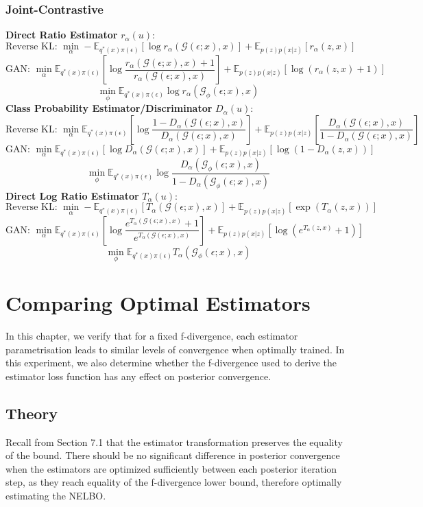 \documentclass[honours,12pt]{unswthesis}
\newcommand{\E}{\mathbb{E}}
\numberwithin{equation}{section}
\theoremstyle{definition}
\begin{document}
\subsection{Joint-Contrastive}
\textbf{Direct Ratio Estimator} $r_\alpha(u)$:
\[\text{Reverse KL: }\min_\alpha -\E_{q^*(x)\pi(\epsilon)}[\log r_\alpha(\mathcal{G}(\epsilon;x),x)]+\E_{p(z)p(x|z)}[r_\alpha(z,x)]\]
\[\text{GAN: }\min_\alpha \E_{q^*(x)\pi(\epsilon)}\left[\log \frac{r_\alpha(\mathcal{G}(\epsilon;x),x)+1}{r_\alpha(\mathcal{G}(\epsilon;x),x)}\right]+\E_{p(z)p(x|z)}[\log(r_\alpha(z,x)+1)]\]
\[\min_\phi \E_{q^*(x)\pi(\epsilon)}\log r_\alpha(\mathcal{G}_\phi(\epsilon;x),x)\]
\textbf{Class Probability Estimator/Discriminator} $D_\alpha(u)$:
\[\text{Reverse KL: }\min_\alpha \E_{q^*(x)\pi(\epsilon)}\left[\log \frac{1-D_\alpha(\mathcal{G}(\epsilon;x),x)}{D_\alpha(\mathcal{G}(\epsilon;x),x)}\right]+\E_{p(z)p(x|z)}\left[\frac{D_\alpha(\mathcal{G}(\epsilon;x),x)}{1-D_\alpha(\mathcal{G}(\epsilon;x),x)}\right]\]
\[\text{GAN: }\min_\alpha \E_{q^*(x)\pi(\epsilon)}[\log D_\alpha(\mathcal{G}(\epsilon;x),x)]+\E_{p(z)p(x|z)}[\log(1-D_\alpha(z,x))]\]
\[\min_\phi \E_{q^*(x)\pi(\epsilon)}\log \frac{D_\alpha(\mathcal{G}_\phi(\epsilon;x),x)}{1-D_\alpha(\mathcal{G}_\phi(\epsilon;x),x)}\]
\textbf{Direct Log Ratio Estimator} $T_\alpha(u)$:
\[\text{Reverse KL: }\min_\alpha -\E_{q^*(x)\pi(\epsilon)}[T_\alpha(\mathcal{G}(\epsilon;x),x)]+\E_{p(z)p(x|z)}[\exp(T_\alpha(z,x))]\]
\[\text{GAN: }\min_\alpha \E_{q^*(x)\pi(\epsilon)}\left[\log \frac{e^{T_\alpha(\mathcal{G}(\epsilon;x),x)}+1}{e^{T_\alpha(\mathcal{G}(\epsilon;x),x)}}\right]+\E_{p(z)p(x|z)}[\log(e^{T_\alpha(z,x)}+1)]\]
\[\min_\phi \E_{q^*(x)\pi(\epsilon)}T_\alpha(\mathcal{G}_\phi(\epsilon;x),x)\]
\chapter{Comparing Optimal Estimators}
In this chapter, we verify that for a fixed f-divergence, each estimator parametrisation leads to similar levels of convergence when optimally trained. In this experiment, we also determine whether the f-divergence used to derive the estimator loss function has any effect on posterior convergence.
\section{Theory}
Recall from Section 7.1 that the estimator transformation preserves the equality of the bound. There should be no significant difference in posterior convergence when the estimators are optimized sufficiently between each posterior iteration step, as they reach equality of the f-divergence lower bound, therefore optimally estimating the NELBO.
\end{document}
